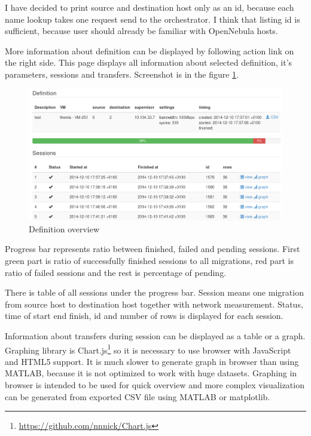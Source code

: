 I have decided to print source and destination host only as an id, because each name lookup takes one request send to the orchestrator. I think that listing id is sufficient, because user should already be familiar with OpenNebula hosts. 

More information about definition can be displayed by following  action link on the right side. This page displays all information about selected definition, it's parameters, sessions and transfers. Screenshot is in the figure \ref{img:themis-definition}.

\begin{figure}[htb]
	\begin{center}
	\includegraphics[width=\textwidth]{themis-definition.png}
	\end{center}
	\caption{Definition overview}
	\label{img:themis-definition}
\end{figure}

Progress bar represents ratio between finished, failed and pending sessions. First green part is ratio of successfully finished sessions to all migrations, red part is ratio of failed sessions and the rest is percentage of pending. 

There is table of all sessions under the progress bar. Session means one migration from source host to destination host together with network measurement.
Status, time of start end finish, id and number of rows is displayed for each session.

Information about transfers during session can be displayed as a table or a graph. Graphing library is Chart.js\footnote{\url{https://github.com/nnnick/Chart.js}} so it is necessary to use browser with JavaScript and \Ac{HTML}5 support. It is much slower to generate graph in browser than using MATLAB, because it is not optimized to work with huge datasets. Graphing in browser is intended to be used for quick overview and more complex visualization can be generated from exported \Ac{CSV} file using MATLAB or matplotlib.


